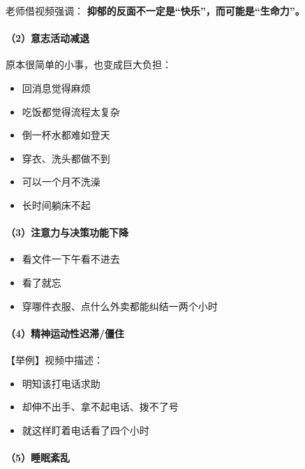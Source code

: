 \documentclass[
  chinese,
  9pt,
  a4paper,
]{ctexart}
\providecommand{\tightlist}{%
  \setlength{\itemsep}{0pt}\setlength{\parskip}{0pt}}
\begin{document}
老师借视频强调：
\textbf{抑郁的反面不一定是``快乐''，而可能是``生命力''。}

\paragraph{（2）意志活动减退}\label{ux610fux5fd7ux6d3bux52a8ux51cfux9000}

原本很简单的小事，也变成巨大负担：

\begin{itemize}
\tightlist
\item
  回消息觉得麻烦
\item
  吃饭都觉得流程太复杂
\item
  倒一杯水都难如登天
\item
  穿衣、洗头都做不到
\item
  可以一个月不洗澡
\item
  长时间躺床不起
\end{itemize}

\paragraph{（3）注意力与决策功能下降}\label{ux6ce8ux610fux529bux4e0eux51b3ux7b56ux529fux80fdux4e0bux964d}

\begin{itemize}
\tightlist
\item
  看文件一下午看不进去
\item
  看了就忘
\item
  穿哪件衣服、点什么外卖都能纠结一两个小时
\end{itemize}

\paragraph{（4）精神运动性迟滞/僵住}\label{ux7cbeux795eux8fd0ux52a8ux6027ux8fdfux6edeux50f5ux4f4f}

【举例】视频中描述：

\begin{itemize}
\tightlist
\item
  明知该打电话求助
\item
  却伸不出手、拿不起电话、拨不了号
\item
  就这样盯着电话看了四个小时
\end{itemize}

\paragraph{（5）睡眠紊乱}\label{ux7761ux7720ux7d0aux4e71}
\end{document}
